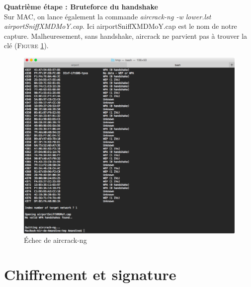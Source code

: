 \documentclass[11pt]{article}
\begin{document}
\textbf{Quatrième étape : Bruteforce du handshake}~\\
Sur MAC, on lance également la commande \textit{aircrack-ng -w lower.lst airportSniffXMDMoY.cap}. Ici airportSniffXMDMoY.cap est le nom de notre capture. 
Malheuresement, sans handshake, aircrack ne parvient pas à trouver la clé (\textsc{Figure \ref{fig:last}}). ~\\
\begin{figure}[hbtp]
        \centering \includegraphics[scale=0.4]{Exercice1/echec.png}
        \caption{Échec de aircrack-ng}
         \label{fig:last}
\end{figure}

\newpage
\section{Chiffrement et signature}
\end{document}
